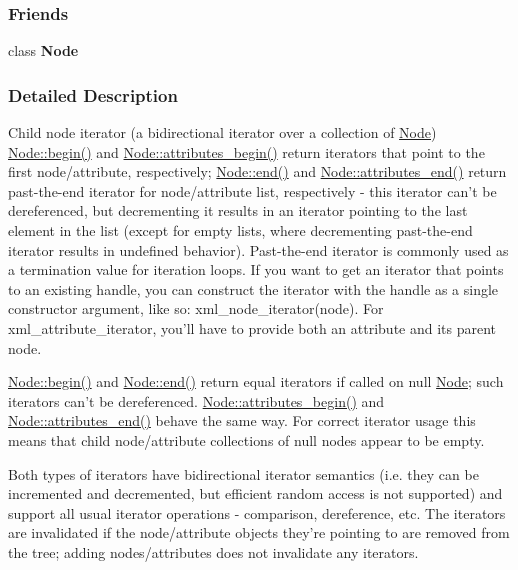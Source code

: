 \subsubsection*{Friends}
\begin{DoxyCompactItemize}
\item 
\hypertarget{classphys_1_1xml_1_1NodeIterator_a6db9d28bd448a131448276ee03de1e6d}{
class {\bfseries Node}}
\label{classphys_1_1xml_1_1NodeIterator_a6db9d28bd448a131448276ee03de1e6d}

\end{DoxyCompactItemize}


\subsubsection{Detailed Description}
Child node iterator (a bidirectional iterator over a collection of \hyperlink{classphys_1_1xml_1_1Node}{Node}) \hyperlink{classphys_1_1xml_1_1Node_a39a71c0c078f648de0e716ed59a0446a}{Node::begin()} and \hyperlink{classphys_1_1xml_1_1Node_a9ede8da51d334d31167a6740e233c103}{Node::attributes\_\-begin()} return iterators that point to the first node/attribute, respectively; \hyperlink{classphys_1_1xml_1_1Node_a1f083209c52d7af4a354db2b3f198cf8}{Node::end()} and \hyperlink{classphys_1_1xml_1_1Node_ac2535dd3ebc22454993f09fb66ace134}{Node::attributes\_\-end()} return past-\/the-\/end iterator for node/attribute list, respectively -\/ this iterator can't be dereferenced, but decrementing it results in an iterator pointing to the last element in the list (except for empty lists, where decrementing past-\/the-\/end iterator results in undefined behavior). Past-\/the-\/end iterator is commonly used as a termination value for iteration loops. If you want to get an iterator that points to an existing handle, you can construct the iterator with the handle as a single constructor argument, like so: xml\_\-node\_\-iterator(node). For xml\_\-attribute\_\-iterator, you'll have to provide both an attribute and its parent node.\par
\par
 \hyperlink{classphys_1_1xml_1_1Node_a39a71c0c078f648de0e716ed59a0446a}{Node::begin()} and \hyperlink{classphys_1_1xml_1_1Node_a1f083209c52d7af4a354db2b3f198cf8}{Node::end()} return equal iterators if called on null \hyperlink{classphys_1_1xml_1_1Node}{Node}; such iterators can't be dereferenced. \hyperlink{classphys_1_1xml_1_1Node_a9ede8da51d334d31167a6740e233c103}{Node::attributes\_\-begin()} and \hyperlink{classphys_1_1xml_1_1Node_ac2535dd3ebc22454993f09fb66ace134}{Node::attributes\_\-end()} behave the same way. For correct iterator usage this means that child node/attribute collections of null nodes appear to be empty.\par
\par
 Both types of iterators have bidirectional iterator semantics (i.e. they can be incremented and decremented, but efficient random access is not supported) and support all usual iterator operations -\/ comparison, dereference, etc. The iterators are invalidated if the node/attribute objects they're pointing to are removed from the tree; adding nodes/attributes does not invalidate any iterators. 

